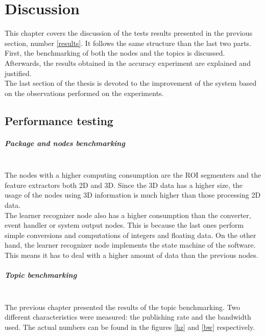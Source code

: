 \chapter{Discussion}
\label{discussion}

This chapter covers the discussion of the tests results presented in the previous section, number \ref{results}.
It follows the same structure than the last two parts. 
First, the benchmarking of both the nodes and the topics is discussed. 
Afterwards, the results obtained in the accuracy experiment are explained and justified. 
\\

The last section of the thesis is devoted to the improvement of the system based on the observations performed on the experiments. 

\section{Performance testing}
	\paragraph{Package and nodes benchmarking}\mbox{}
		\\

			The nodes with a higher computing consumption are the ROI segmenters and the feature extractors both 2D and 3D. 
			Since the 3D data has a higher size, the usage of the nodes using 3D information is much higher than those processing 2D data. 
			\\

			The learner recognizer node also has a higher consumption than the converter, event handler or system output nodes. 
			This is because the last ones perform simple conversions and computations of integers and floating data. 
			On the other hand, the learner recognizer node implements the state machine of the software. 
			This means it has to deal with a higher amount of data than the previous nodes. 




		\paragraph{Topic benchmarking}\mbox{}\\

			The previous chapter presented the results of the topic benchmarking. 
			Two different characteristics were measured: the publishing rate and the bandwidth used. 
			The actual numbers can be found in the figures \ref{hz} and \ref{bw} respectively. 
			\\

